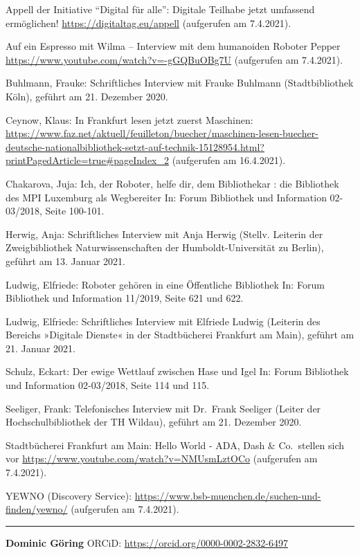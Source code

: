 \documentclass[a4paper,
fontsize=11pt,
oneside,
numbers=noperiodatend,
parskip=half-,
bibliography=totoc,
final
]{scrartcl}
\begin{document}
Appell der Initiative \enquote{Digital für alle}: Digitale Teilhabe
jetzt umfassend ermöglichen! \url{https://digitaltag.eu/appell}
(aufgerufen am 7.4.2021).

Auf ein Espresso mit Wilma -- Interview mit dem humanoiden Roboter
Pepper \url{https://www.youtube.com/watch?v=-gGQBuOBg7U} (aufgerufen am
7.4.2021).

Buhlmann, Frauke: Schriftliches Interview mit Frauke Buhlmann
(Stadtbibliothek Köln), geführt am 21. Dezember 2020.

Ceynow, Klaus: In Frankfurt lesen jetzt zuerst Maschinen:
\url{https://www.faz.net/aktuell/feuilleton/buecher/maschinen-lesen-buecher-deutsche-nationalbibliothek-setzt-auf-technik-15128954.html?printPagedArticle=true\#pageIndex_2}
(aufgerufen am 16.4.2021).

Chakarova, Juja: Ich, der Roboter, helfe dir, dem Bibliothekar : die
Bibliothek des MPI Luxemburg als Wegbereiter In: Forum Bibliothek und
Information 02-03/2018, Seite 100-101.

Herwig, Anja: Schriftliches Interview mit Anja Herwig (Stellv. Leiterin
der Zweigbibliothek Naturwissenschaften der Humboldt-Universität zu
Berlin), geführt am 13. Januar 2021.

Ludwig, Elfriede: Roboter gehören in eine Öffentliche Bibliothek In:
Forum Bibliothek und Information 11/2019, Seite 621 und 622.

Ludwig, Elfriede: Schriftliches Interview mit Elfriede Ludwig (Leiterin
des Bereichs »Digitale Dienste« in der Stadtbücherei Frankfurt am Main),
geführt am 21. Januar 2021.

Schulz, Eckart: Der ewige Wettlauf zwischen Hase und Igel In: Forum
Bibliothek und Information 02-03/2018, Seite 114 und 115.

Seeliger, Frank: Telefonisches Interview mit Dr.~Frank Seeliger (Leiter
der Hochschulbibliothek der TH Wildau), geführt am 21. Dezember 2020.

Stadtbücherei Frankfurt am Main: Hello World - ADA, Dash \& Co.~stellen
sich vor \url{https://www.youtube.com/watch?v=NMUsmLztOCo} (aufgerufen
am 7.4.2021).

YEWNO (Discovery Service):
\url{https://www.bsb-muenchen.de/suchen-und-finden/yewno/} (aufgerufen
am 7.4.2021).

\begin{center}\rule{0.5\linewidth}{0.5pt}\end{center}

\textbf{Dominic Göring} ORCiD:
\url{https://orcid.org/0000-0002-2832-6497}
\end{document}
